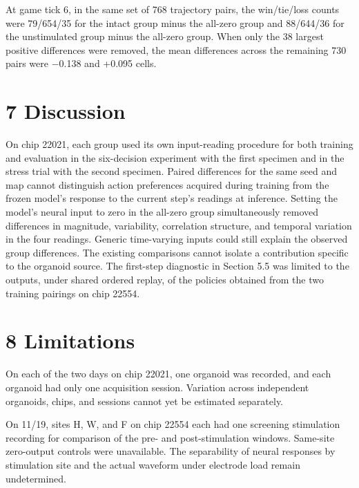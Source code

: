 \documentclass{article}
\begin{document}
At game tick 6, in the same set of 768 trajectory pairs, the win/tie/loss counts were 79/654/35 for the intact group minus the all-zero group and 88/644/36 for the unstimulated group minus the all-zero group. When only the 38 largest positive differences were removed, the mean differences across the remaining 730 pairs were \ensuremath{-}0.138 and +0.095 cells.


\section*{7 Discussion}

On chip 22021, each group used its own input-reading procedure for both training and evaluation in the six-decision experiment with the first specimen and in the stress trial with the second specimen. Paired differences for the same seed and map cannot distinguish action preferences acquired during training from the frozen model's response to the current step's readings at inference. Setting the model's neural input to zero in the all-zero group simultaneously removed differences in magnitude, variability, correlation structure, and temporal variation in the four readings. Generic time-varying inputs could still explain the observed group differences. The existing comparisons cannot isolate a contribution specific to the organoid source. The first-step diagnostic in Section 5.5 was limited to the outputs, under shared ordered replay, of the policies obtained from the two training pairings on chip 22554.


\section*{8 Limitations}

On each of the two days on chip 22021, one organoid was recorded, and each organoid had only one acquisition session. Variation across independent organoids, chips, and sessions cannot yet be estimated separately.


On 11/19, sites H, W, and F on chip 22554 each had one screening stimulation recording for comparison of the pre- and post-stimulation windows. Same-site zero-output controls were unavailable. The separability of neural responses by stimulation site and the actual waveform under electrode load remain undetermined.
\end{document}
